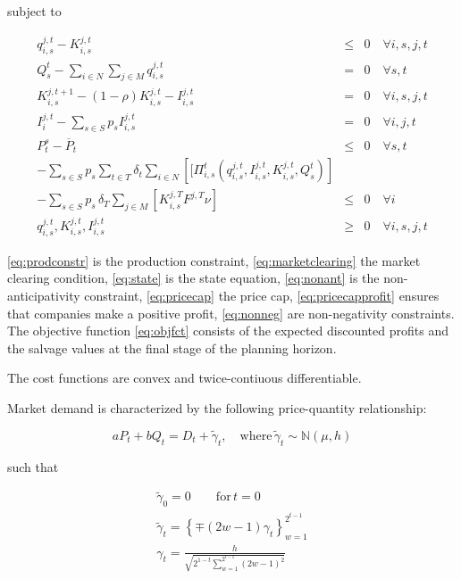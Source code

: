 subject to
  
\begin{eqnarray}  
q_{i,s}^{j,t} - K_{i,s}^{j,t} &\leq& 0 \quad \forall i,s,j,t \label{eq:prodconstr} \\
Q_s^t-\sum_{i\in N}\sum_{j\in M} q_{i,s}^{j,t} &=& 0 \quad \forall s,t \label{eq:marketclearing}\\
K_{i,s}^{j,t+1} - (1-\rho)K_{i,s}^{j,t}-I_{i,s}^{j,t} &=& 0 \quad \forall i,s,j,t \label{eq:state} \\
I_{i}^{j,t}-\sum_{s\in S}p_sI_{i,s}^{j,t} &=& 0 \quad \forall i,j,t \label{eq:nonant}\\
P_t^s - \overline{P}_t &\leq& 0 \quad \forall s,t \label{eq:pricecap}\\
-\sum_{s\in S}p_s \sum_{t\in T}\delta_t\sum_{i\in N}\left[[\Pi_{i,s}^t\left(q_{i,s}^{j,t}, I_{i,s}^{j,t}, K_{i,s}^{j,t}, Q_s^t\right)\right]\nonumber\\
  -\sum_{s\in S}p_s\,\delta_T \sum_{j\in M}\left[K_{i,s}^{j,T}F^{j,T}\nu\right] &\leq& 0 \quad \forall i \label{eq:pricecapprofit}\\
q_{i,s}^{j,t}, K_{i,s}^{j,t}, I_{i,s}^{j,t}  &\geq& 0 \quad \forall i,s,j,t\label{eq:nonneg}
\end{eqnarray}

\eqref{eq:prodconstr} is the production constraint, \eqref{eq:marketclearing} the market clearing condition, \eqref{eq:state} is the state equation, \eqref{eq:nonant} is the non-anticipativity constraint, \eqref{eq:pricecap} the price cap, \eqref{eq:pricecapprofit} ensures that companies make a positive profit, \eqref{eq:nonneg} are non-negativity constraints. The objective function \eqref{eq:objfct} consists of the expected discounted profits and the salvage values at the final stage of the planning horizon.

The cost functions are convex and twice-contiuous differentiable.

Market demand is characterized by the following price-quantity relationship:

\begin{equation}
  \label{eq:marketdemandpq}
  aP_t+bQ_t=D_t+\tilde{\gamma}_t, \quad \mbox{where}\, \tilde{\gamma}_t\sim\mathbb{N}(\mu,h)
\end{equation}

such that

\begin{eqnarray*}
  \label{eq:3}
  \tilde{\gamma}_0=0\qquad\mbox{for}\, t=0\\
   \tilde{\gamma}_t=\left\{\mp(2w-1)\gamma_t\right\}_{w=1}^{2^{t-1}}\\
   \gamma_t=\frac{h}{\sqrt{2^{1-t}\sum_{w=1}^{2^{t-1}}(2w-1)^2}}
\end{eqnarray*}

